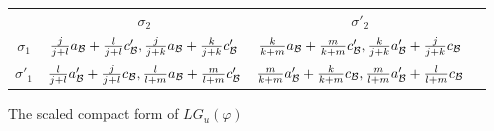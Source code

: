 

\begin{figure}[h]
\renewcommand{\arraystretch}{2.0}
\begin{tabular}{c|c|c|c}
\multicolumn{1}{c}{} & \multicolumn{1}{c}{$\sigma_2$} & \multicolumn{1}{c}{$\sigma'_2$} \\[.5ex]
 \cline{2-3}
$\sigma_1$ & $\frac{j}{j+l}a_{\cal B} + \frac{l}{j+l}c'_{\cal B}, \frac{j}{j + k}a_{\cal B} + \frac{k}{j + k}c'_{\cal B}$ & $\frac{k}{k+m}a_{\cal B} + \frac{m}{k+m}c'_{\cal B}, \frac{k}{j + k}a'_{\cal B} + \frac{j}{j + k}c_{\cal B}$ & \qquad \\[.5ex]
 \cline{2-3}
 $\sigma'_1$ & $\frac{l}{j + l}a'_{\cal B} + \frac{j}{j+l}c_{\cal B}, \frac{l}{l + m}a_{\cal B} + \frac{m}{l + m}c'_{\cal B}$ & $\frac{m}{k+m}a'_{\cal B} + \frac{k}{k+m}c_{\cal B}, \frac{m}{l + m}a'_{\cal B} + \frac{l}{l + m}c_{\cal B}$ & \qquad \\[.5ex]
 \cline{2-3}
 \end{tabular}
 \caption{The scaled compact form of $LG_u(\varphi)$} \label{fig:scaled compact form 2}
\end{figure}


